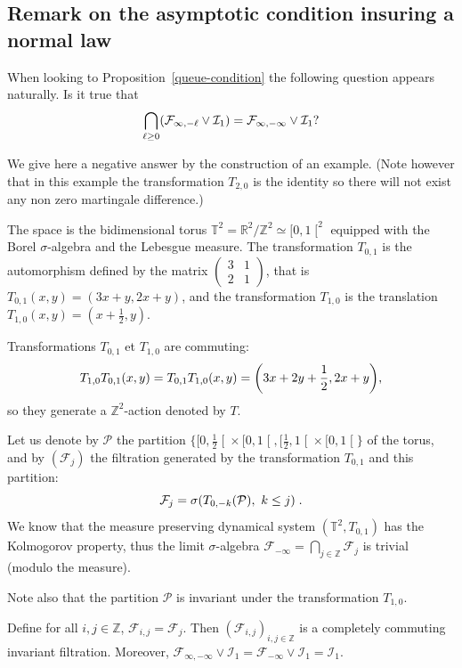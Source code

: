 \documentclass[10pt]{amsart}
\theoremstyle{definition}\newtheorem{defi}[theo]{Definition}\newtheorem{rema}[theo]{Remark}\newtheorem{exam}[theo]{Example}\newtheorem{exem}[theo]{Example}\newtheorem{nota}[theo]{Notation}
\newcommand{\bbT}{\mathbb{T}}
\newcommand{\Z}{\mathbb{Z}}
\newcommand*\R{\mathbb{R}}
\newcommand*\I{\mathcal{I}}
\newcommand*\F{\mathcal{F}}
\renewcommand*\P{\mathcal{P}}
\newcommand{\Fca}{\mathcal{F}}
\let\originalleft\left
\let\originalright\right
\renewcommand{\left}{\mathopen{}\mathclose\bgroup\originalleft}
\renewcommand{\right}{\aftergroup\egroup\originalright}
\begin{document}
\subsection{Remark on the asymptotic condition insuring a normal law}\label{trivial-queue}

When looking to Proposition~\ref{queue-condition} the following question appears naturally. Is it true that
\begin{equation}\label{eq:bad_limit}
\bigcap_{\ell\geq0}\left(\F_{\infty,-\ell}\vee\I_1\right) = \F_{\infty,-\infty}\vee\I_1?
\end{equation}

We give here a negative answer by the construction of an example. (Note however that in this example the transformation $T_{2,0}$ is the identity so there will not exist any non zero martingale difference.)

The space is the bidimensional torus $\bbT^2=\R^2/\Z^2\simeq[0,1\mathclose{[}^2$ equipped with the Borel $\sigma$-algebra and the Lebesgue measure. The transformation $T_{0,1}$ is the automorphism defined by the matrix $
(\begin{smallmatrix} 
3&1\\2&1
\end{smallmatrix})$, that is $T_{0,1}(x,y)=(3x+y,2x+y)$, and the transformation $T_{1,0}$ is the translation $T_{1,0}(x,y)=(x+\frac12,y)$.

Transformations $T_{0,1}$ et $T_{1,0}$ are commuting:
\[
T_{1,0}T_{0,1}(x,y)=T_{0,1}T_{1,0}(x,y)=\left(3x+2y+\frac12,2x+y\right),
\]
so they generate a $\Z^2$-action denoted by $T$.

Let us denote by $\P$ the partition $\{[0,\frac12\mathclose{[}\times[0,1\mathclose{[},[\frac12,1\mathclose{[}\times[0,1\mathclose{[}\}$ of the torus, and by $(\F_j)$ the filtration generated by the transformation $T_{0,1}$ and this partition:
\[
\F_j=\sigma\left(T_{0,-k}\left(\P\right),\ k\leq j\right)\;.
\]
We know that the measure preserving dynamical system $(\bbT^2,T_{0,1})$ has the Kolmogorov property, thus the limit $\sigma$-algebra $\F_{-\infty}=\bigcap_{j\in\Z}\F_j$ is trivial (modulo the measure).

Note also that the partition $\P$ is invariant under the transformation $T_{1,0}$.

Define for all $i,j\in\Z$, $\Fca_{i,j}=\Fca_j$. Then $(\Fca_{i,j})_{i,j\in\Z}$ is a completely commuting invariant filtration. Moreover, $\Fca_{\infty,-\infty}\vee\I_1=\Fca_{-\infty}\vee\I_1=\I_1$.
\end{document}
